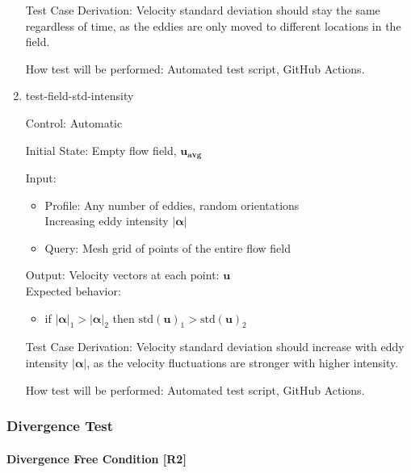 \documentclass[12pt, titlepage]{article}
\begin{document}
\begin{enumerate}
  Test Case Derivation: Velocity standard deviation should stay the same regardless of time, as the eddies are only moved to different locations in the field.

  How test will be performed: Automated test script, GitHub Actions.

  \item{test-field-std-intensity\\}

  Control: Automatic
            
  Initial State: Empty flow field, $\mathbf{u_{avg}}$
            
  Input:
  \begin{itemize}
    \item Profile: Any number of eddies, random orientations\\
    Increasing eddy intensity $|\mathbf{\alpha}|$
    \item Query: Mesh grid of points of the entire flow field
  \end{itemize}
  Output: Velocity vectors at each point: $\mathbf{u}$\\
  Expected behavior:
  \begin{itemize}
    \item if $|\mathbf{\alpha}|_1 > |\mathbf{\alpha}|_2$ then $\text{std}(\mathbf{u})_1 > \text{std}(\mathbf{u})_2$
  \end{itemize}

  Test Case Derivation: Velocity standard deviation should increase with eddy intensity $|\mathbf{\alpha}|$, as the velocity fluctuations are stronger with higher intensity.

  How test will be performed: Automated test script, GitHub Actions.

\end{enumerate}

\subsubsection{Divergence Test} \label{ST:DivFree}
\paragraph{Divergence Free Condition [R2]} 
\end{document}
